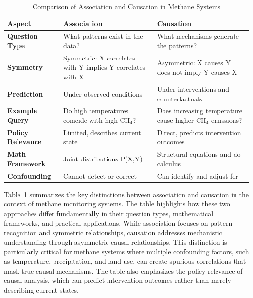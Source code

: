\begin{table}[h!]
	\centering
	\caption[Comparison of Association and Causation in Methane Systems]{Comparison of Association and Causation in Methane Systems}
	\label{tab:association_vs_causation}
	\begin{tabular}{>{\raggedright\arraybackslash}p{3cm}|>{\raggedright\arraybackslash}p{6cm}|>{\raggedright\arraybackslash}p{6cm}}
		\hline
		\textbf{Aspect}           & \textbf{Association}                                       & \textbf{Causation}                                         \\
		\hline
		\textbf{Question Type}    & What patterns exist in the data?                           & What mechanisms generate the patterns?                     \\
		\textbf{Symmetry}         & Symmetric: X correlates with Y implies Y correlates with X & Asymmetric: X causes Y does not imply Y causes X           \\
		\textbf{Prediction}       & Under observed conditions                                  & Under interventions and counterfactuals                    \\
		\textbf{Example Query}    & Do high temperatures coincide with high CH$_4$?            & Does increasing temperature cause higher CH$_4$ emissions? \\
		\textbf{Policy Relevance} & Limited, describes current state                           & Direct, predicts intervention outcomes                     \\
		\textbf{Math Framework}   & Joint distributions P(X,Y)                                 & Structural equations and do-calculus                       \\
		\textbf{Confounding}      & Cannot detect or correct                                   & Can identify and adjust for                                \\
		\hline
	\end{tabular}
\end{table}

Table~\ref{tab:association_vs_causation} summarizes the key distinctions between association and causation in the context of methane monitoring systems. The table highlights how these two approaches differ fundamentally in their question types, mathematical frameworks, and practical applications. While association focuses on pattern recognition and symmetric relationships, causation addresses mechanistic understanding through asymmetric causal relationships. This distinction is particularly critical for methane systems where multiple confounding factors, such as temperature, precipitation, and land use, can create spurious correlations that mask true causal mechanisms. The table also emphasizes the policy relevance of causal analysis, which can predict intervention outcomes rather than merely describing current states.

